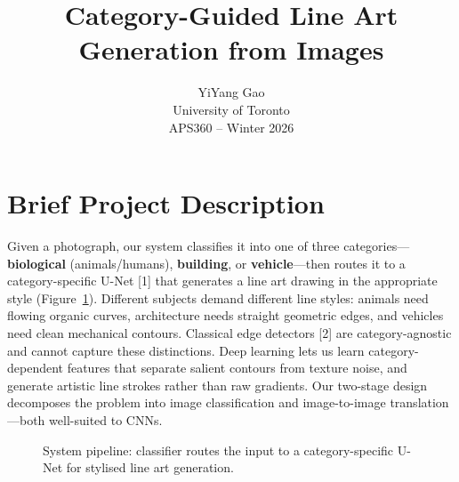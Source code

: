 \documentclass{article}
\title{Category-Guided Line Art Generation from Images}
\author{
YiYang Gao \\
University of Toronto \\
APS360 -- Winter 2026
}
\begin{document}
\maketitle

\section{Brief Project Description}

Given a photograph, our system classifies it into one of three categories---\textbf{biological} (animals/humans), \textbf{building}, or \textbf{vehicle}---then routes it to a category-specific U-Net [1] that generates a line art drawing in the appropriate style (Figure~\ref{fig:pipeline}).
Different subjects demand different line styles: animals need flowing organic curves, architecture needs straight geometric edges, and vehicles need clean mechanical contours.
Classical edge detectors [2] are category-agnostic and cannot capture these distinctions.
Deep learning lets us learn category-dependent features that separate salient contours from texture noise, and generate artistic line strokes rather than raw gradients.
Our two-stage design decomposes the problem into image classification and image-to-image translation---both well-suited to CNNs.

\begin{figure}[h]
\centering
\vspace{-2mm}
\vspace{-2mm}
\caption{System pipeline: classifier routes the input to a category-specific U-Net for stylised line art generation.}
\label{fig:pipeline}
\vspace{-4mm}
\end{figure}
\end{document}
